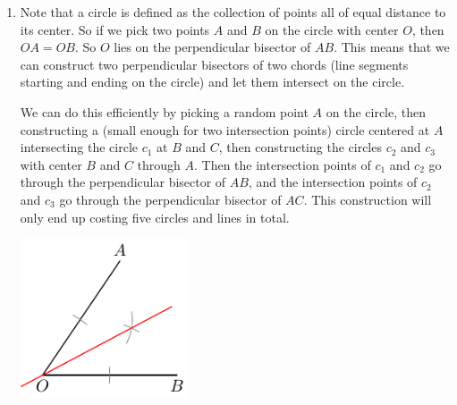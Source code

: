\documentclass[11pt]{scrartcl}
\begin{document}
\begin{enumerate}[label=\textbf{G\arabic*}.]
\begin{enumerate}
        \item Note that a circle is defined as the collection of points all of equal distance to its center. So if we pick two points $A$ and $B$ on the circle with center $O$, then $OA = OB$. So $O$ lies on the perpendicular bisector of $AB$. This means that we can construct two perpendicular bisectors of two chords (line segments starting and ending on the circle) and let them intersect on the circle.
        
        We can do this efficiently by picking a random point $A$ on the circle, then constructing a (small enough for two intersection points) circle centered at $A$ intersecting the circle $c_1$ at $B$ and $C$, then constructing the circles $c_2$ and $c_3$ with center $B$ and $C$ through $A$. Then the intersection points of $c_1$ and $c_2$ go through the perpendicular bisector of $AB$, and the intersection points of $c_2$ and $c_3$ go through the perpendicular bisector of $AC$. This construction will only end up costing five circles and lines in total.
        
        \begin{center}
        \includegraphics[width = 5cm, page = 3]{Diagrams/W2G1sol.pdf}
        \end{center}
    \end{enumerate}
\end{enumerate}

\newpage
\end{document}
